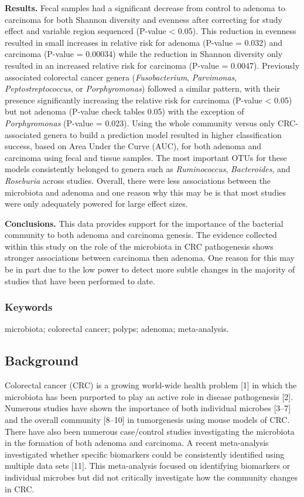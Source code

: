 \documentclass[12pt,]{article}
\begin{document}
\textbf{Results.} Fecal samples had a significant decrease from control
to adenoma to carcinoma for both Shannon diversity and evenness after
correcting for study effect and variable region sequenced (P-value
\textless{} 0.05). This reduction in evenness resulted in small
increases in relative risk for adenoma (P-value = 0.032) and carcinoma
(P-value = 0.00034) while the reduction in Shannon diversity only
resulted in an increased relative risk for carcinoma (P-value = 0.0047).
Previously associated colorectal cancer genera (\emph{Fusobacterium},
\emph{Parvimonas}, \emph{Peptostreptococcus}, or \emph{Porphyromonas})
followed a similar pattern, with their presence significantly increasing
the relative risk for carcinoma (P-value \textless{} 0.05) but not
adenoma (P-value check tables 0.05) with the exception of
\emph{Porphyromonas} (P-value = 0.023). Using the whole community versus
only CRC-associated genera to build a prediction model resulted in
higher classification success, based on Area Under the Curve (AUC), for
both adenoma and carcinoma using fecal and tissue samples. The most
important OTUs for these models consistently belonged to genera such as
\emph{Ruminococcus}, \emph{Bacteroides}, and \emph{Roseburia} across
studies. Overall, there were less associations between the microbiota
and adenoma and one reason why this may be is that most studies were
only adequately powered for large effect sizes.

\textbf{Conclusions.} This data provides support for the importance of
the bacterial community to both adenoma and carcinoma genesis. The
evidence collected within this study on the role of the microbiota in
CRC pathogenesis shows stronger associations between carcinoma then
adenoma. One reason for this may be in part due to the low power to
detect more subtle changes in the majority of studies that have been
performed to date.

\subsubsection{Keywords}\label{keywords}

microbiota; colorectal cancer; polyps; adenoma; meta-analysis.

\newpage

\subsection{Background}\label{background}

Colorectal cancer (CRC) is a growing world-wide health problem {[}1{]}
in which the microbiota has been purported to play an active role in
disease pathogenesis {[}2{]}. Numerous studies have shown the importance
of both individual microbes {[}3--7{]} and the overall community
{[}8--10{]} in tumorgenesis using mouse models of CRC. There have also
been numerous case/control studies investigating the microbiota in the
formation of both adenoma and carcinoma. A recent meta-analysis
investigated whether specific biomarkers could be consistently
identified using multiple data sets {[}11{]}. This meta-analysis focused
on identifying biomarkers or individual microbes but did not critically
investigate how the community changes in CRC.
\end{document}
